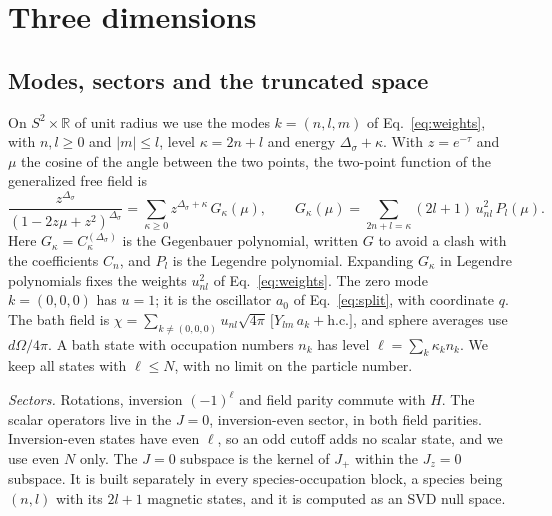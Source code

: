 \section{Three dimensions}\label{d3:sec}

\subsection{Modes, sectors and the truncated space}\label{d3:modes}

On $S^2\times\mathbb R$ of unit radius we use the modes $k=(n,l,m)$ of Eq.~\eqref{eq:weights}, with $n,l\geq0$ and
$|m|\leq l$, level $\kappa=2n+l$ and energy $\Delta_\sigma+\kappa$. With $z=e^{-\tau}$ and $\mu$ the cosine of the
angle between the two points, the two-point function of the generalized free field is
\begin{equation}
 \frac{z^{\Delta_\sigma}}{(1-2z\mu+z^2)^{\Delta_\sigma}}=\sum_{\kappa\geq0}z^{\Delta_\sigma+\kappa}\,G_\kappa(\mu),\qquad
 G_\kappa(\mu)=\sum_{2n+l=\kappa}(2l+1)\,u_{nl}^2\,P_l(\mu).
 \label{d3:weights}
\end{equation}
Here $G_\kappa=C_\kappa^{(\Delta_\sigma)}$ is the Gegenbauer polynomial, written $G$ to avoid a clash with the
coefficients $C_n$, and $P_l$ is the Legendre polynomial. Expanding $G_\kappa$ in Legendre polynomials fixes the
weights $u_{nl}^2$ of Eq.~\eqref{eq:weights}. The zero mode $k=(0,0,0)$ has $u=1$; it is the oscillator $a_0$ of
Eq.~\eqref{eq:split}, with coordinate $q$. The bath field is
$\chi=\sum_{k\neq(0,0,0)}u_{nl}\sqrt{4\pi}\,\big[Y_{lm}\,a_k+\text{h.c.}\big]$, and sphere averages use
$d\Omega/4\pi$. A bath state with occupation numbers $n_k$ has level $\ell=\sum_k\kappa_k n_k$. We keep all states
with $\ell\leq N$, with no limit on the particle number.

\textit{Sectors.} Rotations, inversion $(-1)^\ell$ and field parity commute with $H$. The scalar operators live in
the $J=0$, inversion-even sector, in both field parities. Inversion-even states have even $\ell$, so an odd cutoff
adds no scalar state, and we use even $N$ only. The $J=0$ subspace is the kernel of $J_+$ within the $J_z=0$
subspace. It is built separately in every species-occupation block, a species being $(n,l)$ with its $2l+1$ magnetic
states, and it is computed as an SVD null space.

